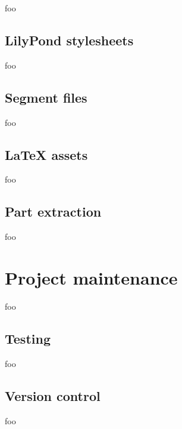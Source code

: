 foo

\subsection{LilyPond stylesheets}

foo

\subsection{Segment files}

foo

\subsection{LaTeX assets}

foo

\subsection{Part extraction}

foo

\section{Project maintenance}

foo

\subsection{Testing}

foo

\subsection{Version control}

foo